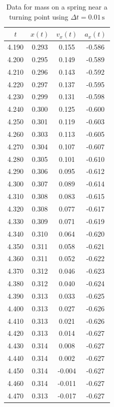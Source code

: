 \begin{table}[!t]
\caption{Data for mass on a spring near a turning point using  
$\Delta t=0.01\, \mbox{s}$}
\begin{center}
\begin{tabular}{cccc}
$t$ & $x(t)$ & $v_x(t)$ & $a_x(t)$ \\
\hline
4.190  &  0.293  &  0.155  &  -0.586\\
4.200  &  0.295  &  0.149  &  -0.589\\
4.210  &  0.296  &  0.143  &  -0.592\\
4.220  &  0.297  &  0.137  &  -0.595\\
4.230  &  0.299  &  0.131  &  -0.598\\
4.240  &  0.300  &  0.125  &  -0.600\\
4.250  &  0.301  &  0.119  &  -0.603\\
4.260  &  0.303  &  0.113  &  -0.605\\
4.270  &  0.304  &  0.107  &  -0.607\\
4.280  &  0.305  &  0.101  &  -0.610\\
4.290  &  0.306  &  0.095  &  -0.612\\
4.300  &  0.307  &  0.089  &  -0.614\\
4.310  &  0.308  &  0.083  &  -0.615\\
4.320  &  0.308  &  0.077  &  -0.617\\
4.330  &  0.309  &  0.071  &  -0.619\\
4.340  &  0.310  &  0.064  &  -0.620\\
4.350  &  0.311  &  0.058  &  -0.621\\
4.360  &  0.311  &  0.052  &  -0.622\\
4.370  &  0.312  &  0.046  &  -0.623\\
4.380  &  0.312  &  0.040  &  -0.624\\
4.390  &  0.313  &  0.033  &  -0.625\\
4.400  &  0.313  &  0.027  &  -0.626\\
4.410  &  0.313  &  0.021  &  -0.626\\
4.420  &  0.313  &  0.014  &  -0.627\\
4.430  &  0.314  &  0.008  &  -0.627\\
4.440  &  0.314  &  0.002  &  -0.627\\
4.450  &  0.314  &  -0.004  &  -0.627\\
4.460  &  0.314  &  -0.011  &  -0.627\\
4.470  &  0.313  &  -0.017  &  -0.627\\

\end{tabular}
\end{center}
\end{table}
